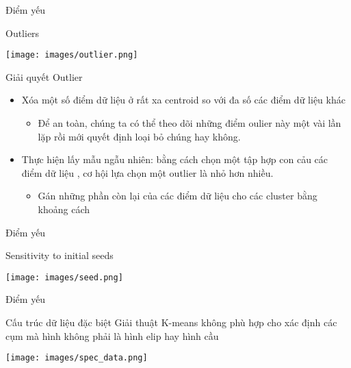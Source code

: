 \documentclass[english,10pt,table]{beamer}
\begin{document}
\begin{frame}{Điểm yếu}
	\begin{block} {Outliers}
	\begin{center}
		\texttt{[image: images/outlier.png]}
	\end{center}
	\end{block}
\end{frame}


\begin{frame}{Giải quyết Outlier}
\begin{itemize}
	\item Xóa một số điểm dữ liệu ở rất xa centroid so với đa số các điểm dữ liệu khác
	 	\begin{itemize}
	 		\item Để an toàn, chúng ta có thể theo dõi những điểm oulier này một vài lần lặp rồi mới quyết định loại bỏ chúng hay không.
	 	\end{itemize}
	\item Thực hiện lấy mẫu ngẫu nhiên: bằng cách chọn một tập hợp con cảu các điểm dữ liệu , cơ hội lựa chọn một outlier là nhỏ hơn nhiều.
		\begin{itemize}
			\item Gán những phần còn lại của các điểm dữ liệu cho các cluster bằng khoảng cách
		\end{itemize}
\end{itemize}
\end{frame}

\begin{frame}{Điểm yếu}
\begin{block} {Sensitivity to initial seeds}
	\begin{center}
		\texttt{[image: images/seed.png]}
	\end{center}
\end{block}
\end{frame}

\begin{frame}{Điểm yếu}
\begin{block} {Cấu trúc dữ liệu đặc biệt}
	Giải thuật K-means không phù hợp cho xác định các cụm mà hình không phải là hình elip hay hình cầu
	\begin{center}
		\texttt{[image: images/spec\_data.png]}
	\end{center}
\end{block}
\end{frame}
\end{document}
